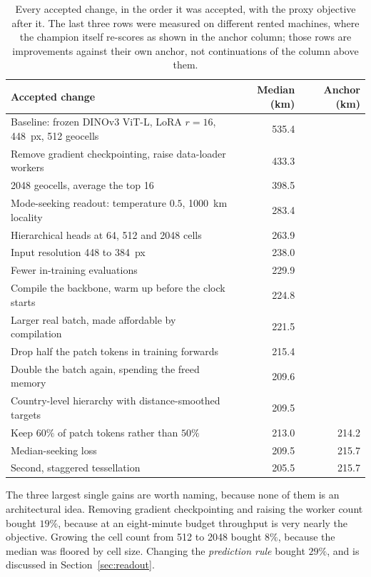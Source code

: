 \documentclass[11pt,a4paper]{article}
\begin{document}
\begin{table}[t]
\centering
\footnotesize
\begin{tabular}{lrr}
\toprule
Accepted change & Median (km) & Anchor (km) \\
\midrule
Baseline: frozen DINOv3 ViT-L, LoRA $r{=}16$, 448~px, 512 geocells & 535.4 & \\
Remove gradient checkpointing, raise data-loader workers & 433.3 & \\
2048 geocells, average the top 16 & 398.5 & \\
Mode-seeking readout: temperature $0.5$, 1000~km locality & 283.4 & \\
Hierarchical heads at 64, 512 and 2048 cells & 263.9 & \\
Input resolution 448 to 384~px & 238.0 & \\
Fewer in-training evaluations & 229.9 & \\
Compile the backbone, warm up before the clock starts & 224.8 & \\
Larger real batch, made affordable by compilation & 221.5 & \\
Drop half the patch tokens in training forwards & 215.4 & \\
Double the batch again, spending the freed memory & 209.6 & \\
Country-level hierarchy with distance-smoothed targets & 209.5 & \\
Keep $60\%$ of patch tokens rather than $50\%$ & 213.0 & 214.2 \\
Median-seeking loss & 209.5 & 215.7 \\
Second, staggered tessellation & 205.5 & 215.7 \\
\bottomrule
\end{tabular}
\caption{Every accepted change, in the order it was accepted, with the proxy objective after
it. The last three rows were measured on different rented machines, where the champion itself
re-scores as shown in the anchor column; those rows are improvements against their own anchor,
not continuations of the column above them.}
\label{tab:ratchet}
\end{table}

The three largest single gains are worth naming, because none of them is an architectural
idea. Removing gradient checkpointing and raising the worker count bought $19\%$, because at
an eight-minute budget throughput is very nearly the objective. Growing the cell count from
512 to 2048 bought $8\%$, because the median was floored by cell size. Changing the
\emph{prediction rule} bought $29\%$, and is discussed in Section~\ref{sec:readout}.
\end{document}
